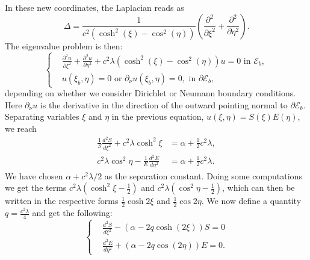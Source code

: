 \documentclass{amsart}
\theoremstyle{definition}
\theoremstyle{remark}
\newcommand{\al}{\alpha}
\numberwithin{equation}{section}
\theoremstyle{definition}
\theoremstyle{remark}
\begin{document}
In these new coordinates, the Laplacian reads as \begin{equation}
	\Delta=\frac{1}{c^2(\cosh^2(\xi)-\cos^2(\eta))}\left(\frac{\partial^2}{\partial\xi^2}+\frac{\partial^2}{\partial\eta^2}\right).
\end{equation}The eigenvalue problem is then:\begin{equation}\left\{
	\begin{aligned}
		&\frac{\partial^2u}{\partial\xi^2}+\frac{\partial^2u}{\partial\eta^2}+c^2\lambda\left(\cosh^2(\xi)-\cos^2(\eta)\right)u=0\text{ in }\mathcal{E}_b,\\
		&u(\xi_b,\eta)=0 \text{ or }\partial_\nu u(\xi_b,\eta)=0, \text{ in }\partial\mathcal{E}_b,
	\end{aligned}\right.
\end{equation}depending on whether we consider Dirichlet or Neumann boundary conditions. Here $\partial_\nu u$ is the derivative in the direction of the outward pointing normal to $\partial\mathcal{E}_b$.	Separating variables $\xi$ and $\eta$ in the previous equation, $u(\xi,\eta)=S(\xi)E(\eta)$, we reach
\begin{equation}
	\begin{aligned}
		\frac{1}{S} \frac{d^2 S}{d \xi^2}+c^2 \lambda \cosh ^2 \xi & =\al+\frac{1}{2} c^2 \lambda, \\
		c^2 \lambda \cos ^2 \eta-\frac{1}{E} \frac{d^2 E}{d \eta^2} & =\al+\frac{1}{2} c^2\lambda.
	\end{aligned}
\end{equation}
We have chosen $\al+c^2 \lambda / 2$ as the separation constant. Doing some computations we get the terms $c^2 \lambda\left(\cosh ^2 \xi-\frac{1}{2}\right)$ and $c^2 \lambda\left(\cos ^2 \eta-\frac{1}{2}\right)$, which can then be written in the respective forms $\frac{1}{2} \cosh 2 \xi$ and $\frac{1}{2} \cos 2 \eta$.  We now define a quantity $q=\frac{c^2 \lambda}{4}$ and get the following: \begin{equation}\label{sep}
	\left\{\begin{aligned}
&	\frac{d^2S}{d\xi^2}-\left(\alpha-2q\cosh(2\xi)\right)S=0	\\&\frac{d^2E}{d\eta^2}+\left(\alpha-2q\cos(2\eta)\right)E=0.
	\end{aligned}\right.
\end{equation}
\end{document}

